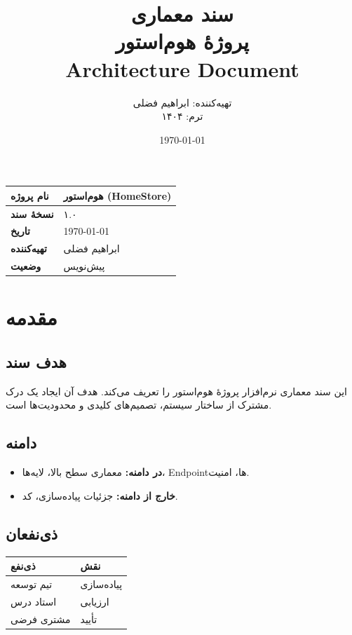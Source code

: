 \documentclass[12pt, a4paper]{article}
\title{
    \vspace{-1cm}
    \textbf{\Huge سند معماری}\\[0.3cm]
    \textbf{\LARGE پروژهٔ هوم‌استور}\\[0.5cm]
    \large Architecture Document
}
\author{
    تهیه‌کننده: ابراهیم فضلی\\
    ترم: ۱۴۰۴
}
\date{\today}
\begin{document}
\maketitle
\thispagestyle{empty}

\vspace{1cm}

\begin{center}
\begin{tabular}{|l|l|}
\hline
\textbf{نام پروژه} & هوم‌استور (HomeStore) \\
\hline
\textbf{نسخهٔ سند} & ۱.۰ \\
\hline
\textbf{تاریخ} & \today \\
\hline
\textbf{تهیه‌کننده} & ابراهیم فضلی \\
\hline
\textbf{وضعیت} & پیش‌نویس \\
\hline
\end{tabular}
\end{center}

\newpage
\tableofcontents
\newpage

\section{مقدمه}

\subsection{هدف سند}
این سند معماری نرم‌افزار پروژهٔ هوم‌استور را تعریف می‌کند.
هدف آن ایجاد یک درک مشترک از ساختار سیستم، تصمیم‌های کلیدی و
محدودیت‌ها است.

\subsection{دامنه}
\begin{itemize}
    \item \textbf{در دامنه:} معماری سطح بالا، لایه‌ها، Endpointها، امنیت.
    \item \textbf{خارج از دامنه:} جزئیات پیاده‌سازی، کد.
\end{itemize}

\subsection{ذی‌نفعان}
\begin{center}
\begin{tabular}{|l|l|}
\hline
\textbf{ذی‌نفع} & \textbf{نقش} \\
\hline
تیم توسعه & پیاده‌سازی \\
\hline
استاد درس & ارزیابی \\
\hline
مشتری فرضی & تأیید \\
\hline
\end{tabular}
\end{center}
\end{document}
